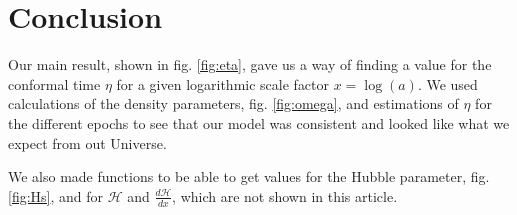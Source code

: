 \documentclass[a4paper,norsk, 10pt]{article}
\begin{document}
\section{Conclusion}

Our main result, shown in fig. \ref{fig:eta}, gave us a way of finding a value for the conformal time $\eta$ for a given logarithmic scale factor $x = \log(a)$. We used calculations of the density parameters, fig. \ref{fig:omega}, and estimations of $\eta$ for the different epochs to see that our model was consistent and looked like what we expect from out Universe. 

We also made functions to be able to get values for the Hubble parameter, fig. \ref{fig:Hs}, and for $\mathcal{H}$ and $\frac{d\mathcal{H}}{dx}$, which are not shown in this article.
\end{document}
